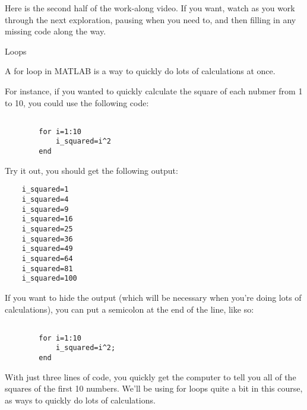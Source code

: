 \documentclass{ximera}
\begin{document}
\begin{exploration}
\begin{remark}
  Here is the second half of the work-along video. If you want, watch as you work through the next exploration, pausing when you need to, and then filling in any missing code along the way.

  \begin{center}
  \end{center}

\end{remark}


  
  \begin{remark}{Loops}
      
      A for loop in MATLAB is a way to quickly do lots of calculations at once.

  For instance, if you wanted to quickly calculate the square of each nubmer from 1 to 10, you could use the following code:

  \begin{verbatim}

        for i=1:10
            i_squared=i^2
        end

  \end{verbatim}

  Try it out, you should get the following output:

  \begin{verbatim}
    i_squared=1
    i_squared=4
    i_squared=9
    i_squared=16
    i_squared=25
    i_squared=36
    i_squared=49
    i_squared=64
    i_squared=81
    i_squared=100
  \end{verbatim}

  If you want to hide the output (which will be necessary when you're doing lots of calculations), you can put a semicolon at the end of the line, like so:

  \begin{verbatim}

        for i=1:10
            i_squared=i^2;
        end
  \end{verbatim}

  With just three lines of code, you quickly get the computer to tell you all of the squares of the first 10 numbers. We'll be using for loops quite a bit in this course, as ways to quickly do lots of calculations. 
  \end{remark}
\end{exploration}
\end{document}
